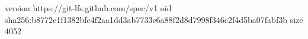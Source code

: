 version https://git-lfs.github.com/spec/v1
oid sha256:b8772e1f1382bfc4f2aa1dd3ab7733c6a88f2d8d7998f346c2f4d5ba07fabf3b
size 4052
